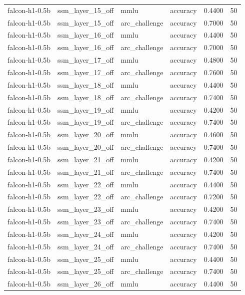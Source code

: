 \begin{tabular}{llllrr}
falcon-h1-0.5b & ssm_layer_15_off & mmlu & accuracy & 0.4400 & 50 \\
falcon-h1-0.5b & ssm_layer_15_off & arc_challenge & accuracy & 0.7000 & 50 \\
falcon-h1-0.5b & ssm_layer_16_off & mmlu & accuracy & 0.4400 & 50 \\
falcon-h1-0.5b & ssm_layer_16_off & arc_challenge & accuracy & 0.7000 & 50 \\
falcon-h1-0.5b & ssm_layer_17_off & mmlu & accuracy & 0.4800 & 50 \\
falcon-h1-0.5b & ssm_layer_17_off & arc_challenge & accuracy & 0.7600 & 50 \\
falcon-h1-0.5b & ssm_layer_18_off & mmlu & accuracy & 0.4400 & 50 \\
falcon-h1-0.5b & ssm_layer_18_off & arc_challenge & accuracy & 0.7400 & 50 \\
falcon-h1-0.5b & ssm_layer_19_off & mmlu & accuracy & 0.4200 & 50 \\
falcon-h1-0.5b & ssm_layer_19_off & arc_challenge & accuracy & 0.7400 & 50 \\
falcon-h1-0.5b & ssm_layer_20_off & mmlu & accuracy & 0.4600 & 50 \\
falcon-h1-0.5b & ssm_layer_20_off & arc_challenge & accuracy & 0.7400 & 50 \\
falcon-h1-0.5b & ssm_layer_21_off & mmlu & accuracy & 0.4200 & 50 \\
falcon-h1-0.5b & ssm_layer_21_off & arc_challenge & accuracy & 0.7400 & 50 \\
falcon-h1-0.5b & ssm_layer_22_off & mmlu & accuracy & 0.4400 & 50 \\
falcon-h1-0.5b & ssm_layer_22_off & arc_challenge & accuracy & 0.7200 & 50 \\
falcon-h1-0.5b & ssm_layer_23_off & mmlu & accuracy & 0.4200 & 50 \\
falcon-h1-0.5b & ssm_layer_23_off & arc_challenge & accuracy & 0.7400 & 50 \\
falcon-h1-0.5b & ssm_layer_24_off & mmlu & accuracy & 0.4200 & 50 \\
falcon-h1-0.5b & ssm_layer_24_off & arc_challenge & accuracy & 0.7400 & 50 \\
falcon-h1-0.5b & ssm_layer_25_off & mmlu & accuracy & 0.4400 & 50 \\
falcon-h1-0.5b & ssm_layer_25_off & arc_challenge & accuracy & 0.7400 & 50 \\
falcon-h1-0.5b & ssm_layer_26_off & mmlu & accuracy & 0.4400 & 50 \\

\end{tabular}

